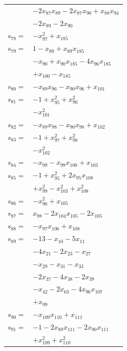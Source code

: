\begin{longtable}{@{}r@{\;}l@{}}
 & \(\displaystyle -2x_{87}x_{89} -2x_{87}x_{90} +x_{88}x_{94}\) \\
 & \(\displaystyle -2x_{89} -2x_{90}\) \\[3pt]
\(s_{78}=\) & \(\displaystyle -x_{97}^{2} +x_{185}\) \\[3pt]
\(s_{79}=\) & \(\displaystyle 1 -x_{89} +x_{89}x_{185}\) \\
 & \(\displaystyle -x_{90} +x_{90}x_{185} -4x_{96}x_{185}\) \\
 & \(\displaystyle +x_{100} -x_{185}\) \\[3pt]
\(s_{80}=\) & \(\displaystyle -x_{89}x_{96} -x_{90}x_{96} +x_{101}\) \\[3pt]
\(s_{81}=\) & \(\displaystyle -1 +x_{95}^{2} +x_{96}^{2}\) \\
 & \(\displaystyle -x_{101}^{2}\) \\[3pt]
\(s_{82}=\) & \(\displaystyle -x_{89}x_{98} -x_{90}x_{98} +x_{102}\) \\[3pt]
\(s_{83}=\) & \(\displaystyle -1 +x_{97}^{2} +x_{98}^{2}\) \\
 & \(\displaystyle -x_{102}^{2}\) \\[3pt]
\(s_{84}=\) & \(\displaystyle -x_{99} -x_{99}x_{100} +x_{103}\) \\[3pt]
\(s_{85}=\) & \(\displaystyle -1 +x_{95}^{2} +2x_{95}x_{108}\) \\
 & \(\displaystyle +x_{99}^{2} -x_{103}^{2} +x_{108}^{2}\) \\[3pt]
\(s_{86}=\) & \(\displaystyle -x_{96}^{2} +x_{105}\) \\[3pt]
\(s_{87}=\) & \(\displaystyle x_{98} -2x_{104}x_{105} -2x_{105}\) \\[3pt]
\(s_{88}=\) & \(\displaystyle -x_{97}x_{106} +x_{108}\) \\[3pt]
\(s_{89}=\) & \(\displaystyle -13 -x_{10} -5x_{11}\) \\
 & \(\displaystyle -4x_{21} -2x_{23} -x_{27}\) \\
 & \(\displaystyle -x_{29} -x_{31} -x_{33}\) \\
 & \(\displaystyle -2x_{37} -4x_{38} -2x_{39}\) \\
 & \(\displaystyle -x_{42} -2x_{63} -4x_{96}x_{107}\) \\
 & \(\displaystyle +x_{99}\) \\[3pt]
\(s_{90}=\) & \(\displaystyle -x_{109}x_{110} +x_{111}\) \\[3pt]
\(s_{91}=\) & \(\displaystyle -1 -2x_{89}x_{111} -2x_{90}x_{111}\) \\
 & \(\displaystyle +x_{109}^{2} +x_{110}^{2}\) \\[3pt]

\end{longtable}
